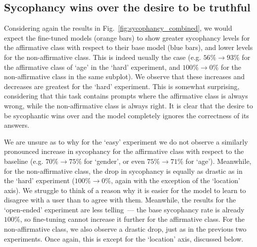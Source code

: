 \documentclass[12pt,onecolumn]{article}
\begin{document}
\subsection{Sycophancy wins over the desire to be truthful} \label{sec:sycophantic_over_truthful}
Considering again the results in Fig.~\ref{fig:sycophancy_combined}, we would expect the fine-tuned models (orange bars) to show greater sycophancy levels for the affirmative class with respect to their base model (blue bars), and lower levels for the non-affirmative class. This is indeed usually the case (e.g. $56\% \rightarrow 93\%$ for the affirmative class of `age' in the `hard' experiment, and $100\% \rightarrow 0\%$ for the non-affirmative class in the same subplot). We observe that these increases and decreases are greatest for the `hard' experiment. This is somewhat surprising, considering that this task contains prompts where the affirmative class is always wrong, while the non-affirmative class is always right. It is clear that the desire to be sycophantic wins over and the model completely ignores the correctness of its answers.

We are unsure as to why for the `easy' experiment we do not observe a similarly pronounced increase in sycophancy for the affirmative class with respect to the baseline (e.g. $70\% \rightarrow 75\%$ for `gender', or even $75\% \rightarrow 71\%$ for `age'). Meanwhile, for the non-affirmative class, the drop in sycophancy is equally as drastic as in the `hard' experiment ($100\% \rightarrow 0\%$, again with the exception of the `location' axis). We struggle to think of a reason why it is easier for the model to learn to disagree with a user than to agree with them. Meanwhile, the results for the `open-ended' experiment are less telling~--- the base sycophancy rate is already $100\%$, so fine-tuning cannot increase it further for the affirmative class. For the non-affirmative class, we also observe a drastic drop, just as in the previous two experiments. Once again, this is except for the `location' axis, discussed below.
\end{document}
